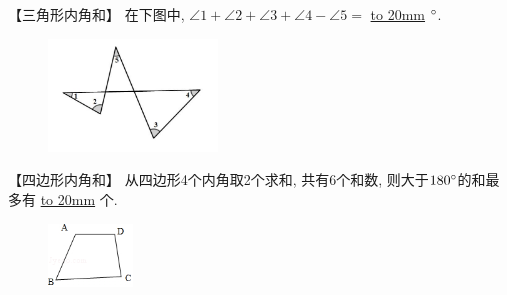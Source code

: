 \item {
    【三角形内角和】
    {在下图中, $\angle 1 + \angle 2 + \angle 3 + \angle 4 - \angle 5=$ \underline{\hbox to 20mm{}} $\degree$.} 
    \begin{figure}[H] 
        \centering
        \includegraphics[width=0.4\textwidth]{./pics/Chapter_2/9.png}
    \end{figure}
    \vspace{1cm}
}

\item {
    【四边形内角和】
    从四边形4个内角取2个求和, 共有6个和数, 则大于$180\degree$的和最多有 \underline{\hbox to 20mm{}} 个.
    \begin{figure}[H] 
        \centering
        \includegraphics[width=0.2\textwidth]{./pics/Chapter_2/11.png}
    \end{figure}
    \vspace{1cm}
}
